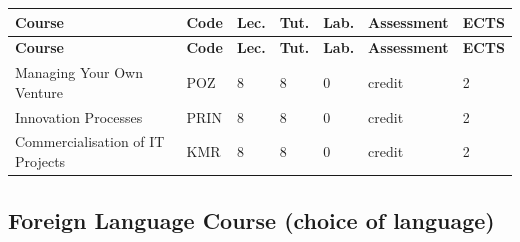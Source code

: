 \documentclass[12pt,a4paper]{article}
\newcommand{\thdrule}{\noalign{\global\setlength{\extrarowheight}{0pt}}}
\newcommand{\thdend}{\noalign{\global\setlength{\extrarowheight}{4pt}}}
\begin{document}
{\scriptsize
\begin{longtable}{m{5.5cm}m{0.8cm}m{1cm}m{1cm}m{1cm}m{1.7cm}m{0.7cm}}
\thdrule\toprule
\rowcolor{pjatkRed}
{\color{white}\footnotesize\textbf{\vphantom{Ag}Course}} & {\color{white}\footnotesize\textbf{\vphantom{Ag}Code}} & {\color{white}\footnotesize\textbf{\vphantom{Ag}Lec.}} & {\color{white}\footnotesize\textbf{\vphantom{Ag}Tut.}} & {\color{white}\footnotesize\textbf{\vphantom{Ag}Lab.}} & {\color{white}\footnotesize\textbf{\vphantom{Ag}Assessment}} & {\color{white}\footnotesize\textbf{\vphantom{Ag}ECTS}} \\
\midrule\thdend
\endfirsthead
\thdrule\toprule
\rowcolor{pjatkRed}
{\color{white}\footnotesize\textbf{\vphantom{Ag}Course}} & {\color{white}\footnotesize\textbf{\vphantom{Ag}Code}} & {\color{white}\footnotesize\textbf{\vphantom{Ag}Lec.}} & {\color{white}\footnotesize\textbf{\vphantom{Ag}Tut.}} & {\color{white}\footnotesize\textbf{\vphantom{Ag}Lab.}} & {\color{white}\footnotesize\textbf{\vphantom{Ag}Assessment}} & {\color{white}\footnotesize\textbf{\vphantom{Ag}ECTS}} \\
\midrule\thdend
\endhead
\rowcolor{tableRowLight} Managing Your Own Venture & POZ & 8 & 8 & 0 & {\scriptsize credit} & 2 \\
\rowcolor{tableRowAlt} Innovation Processes & PRIN & 8 & 8 & 0 & {\scriptsize credit} & 2 \\
\rowcolor{tableRowLight} Commercialisation of IT Projects & KMR & 8 & 8 & 0 & {\scriptsize credit} & 2 \\
\bottomrule
\end{longtable}}

\subsection*{Foreign Language Course (choice of language)}
\end{document}
